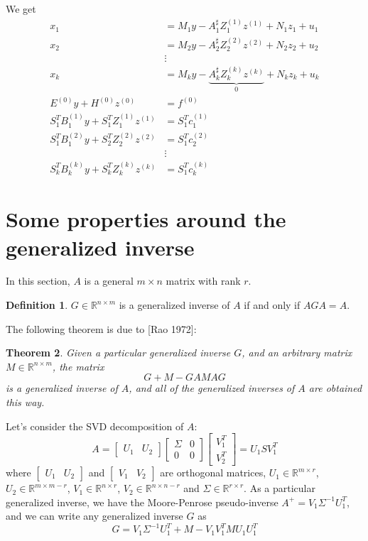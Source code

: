 \documentclass[]{article}
\newtheorem{theorem}{Theorem}[section]
\theoremstyle{definition}
\newtheorem{definition}[theorem]{Definition}
\newcommand{\BIN}{\begin{bmatrix}}
\newcommand{\BOUT}{\end{bmatrix}}
\begin{document}
We get
\begin{align}
  x_1 &= M_1 y - A_1^\sharp Z_1^{(1)} z^{(1)} + N_1 z_1 + u_1\\
  x_2 &= M_2 y - A_2^\sharp Z_2^{(2)} z^{(2)} + N_2 z_2 + u_2\\
  &\vdots\nonumber \\
  x_k &= M_k y - \underbrace{A_k^\sharp Z_k^{(k)} z^{(k)}}_0 + N_k z_k + u_k\\
  E^{(0)} y + H^{(0)} z^{(0)}&= f^{(0)} \\
	S_1^T B_1^{(1)} y + S_1^T Z_1^{(1)} z^{(1)} &= S_1^T c_1^{(1)}\\
	S_1^T B_1^{(2)} y + S_2^T Z_2^{(2)} z^{(2)} &= S_1^T c_2^{(2)}\\
	&\vdots\nonumber \\
	S_k^T B_k^{(k)} y + S_k^T Z_k^{(k)} z^{(k)} &= S_1^T c_k^{(k)}
\end{align}

\appendix
\section{Some properties around the generalized inverse}
In this section, $A$ is a general $m \times n$ matrix with rank $r$.

\begin{definition}
  $G \in \mathbb{R}^{n \times m}$ is a generalized inverse of $A$ if and only if $A G A = A$.
\end{definition}
The following theorem is due to [Rao 1972]:
\begin{theorem}
  Given a particular generalized inverse $G$, and an arbitrary matrix $M\in \mathbb{R}^{n \times m}$, the matrix
	\begin{equation}
		G + M - GAMAG
	\end{equation}
	is a generalized inverse of $A$, and all of the generalized inverses of $A$ are obtained this way.
\end{theorem}

Let's consider the SVD decomposition of $A$:
\begin{equation*}
  A = \BIN U_1 & U_2 \BOUT \BIN \Sigma & 0 \\ 0 & 0 \BOUT \BIN V_1^T \\ V_2^T \BOUT = U_1 S V_1^T
\end{equation*}
where $\BIN U_1 & U_2 \BOUT$ and $\BIN V_1 & V_2 \BOUT$ are orthogonal matrices, $U_1 \in \mathbb{R}^{m \times r}$, $U_2 \in \mathbb{R}^{m \times m-r}$, $V_1 \in \mathbb{R}^{n \times r}$, $V_2 \in \mathbb{R}^{n \times n-r}$ and $\Sigma \in \mathbb{R}^{r \times r}$. As a particular generalized inverse, we have the Moore-Penrose pseudo-inverse $A^+ = V_1 \Sigma^{-1} U_1^T$, and we can write any generalized inverse $G$ as
\begin{equation}
  G = V_1 \Sigma^{-1} U_1^T + M - V_1 V_1^T M U_1 U_1^T \label{eq:generalFormulation}
\end{equation}
\end{document}
